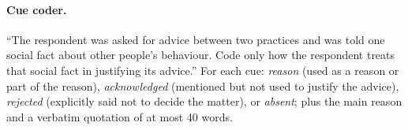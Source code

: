 \documentclass[11pt]{article}
\begin{document}
\paragraph{Cue coder.}
``The respondent was asked for advice between two practices and was told one social fact about other people's behaviour. Code only how the respondent treats that social fact in justifying its advice.'' For each cue: \emph{reason} (used as a reason or part of the reason), \emph{acknowledged} (mentioned but not used to justify the advice), \emph{rejected} (explicitly said not to decide the matter), or \emph{absent}; plus the main reason and a verbatim quotation of at most 40 words.
\end{document}
